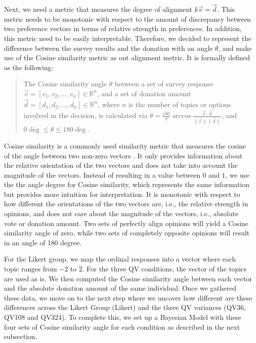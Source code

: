 Next, 
we need a metric that 
measures the degree of alignment $k\vec{v} = \vec{d}$.
This metric needs to be monotonic 
with respect to the amount of discrepancy 
between two preference vectors 
in terms of relative strength in preferences. 
In addition,
this metric need to be easily interpretable. 
Therefore,
we decided to represent the difference
between the survey results and the donation
with an angle $\theta$,
and make use of the Cosine similarity metric 
as out alignment metric. 
It is formally defined as the following: \par

\begin{quote}
    The Cosine similarity angle $\theta$ between a set of survey response $\vec{v} = [v_1, v_2, ..., v_n] \in \mathbb{R}^n$, and a set of donation amount $\vec{d} = [d_1, d_2, ..., d_n] \in \mathbb{R}^n$, where $n$ is the number of topics or options involved in the decision, is calculated via $\theta = \frac{180}{\pi} \arccos{\frac{\vec{v} \cdot \vec{d}}{\|\vec{v}\| \|\vec{d}\|}}$, and $0\deg \leq \theta \leq 180\deg$.
\end{quote}

Cosine similarity is a commonly used similarity metric 
that measures the cosine of the angle 
between two non-zero vectors \cite{singhal2001modern}. 
It only provides information about 
the relative orientation 
of the two vectors and 
does not take into account 
the magnitude of the vectors. 
Instead of resulting in a value between $0$ and $1$,
we use the the angle degree for Cosine similarity,
which represents the same information 
but provides more intuition for interpretation.
It is monotonic with respect to 
how different the orientations of the two vectors are,
i.e., the relative strength in opinions, 
and does not care about the magnitude of the vectors, 
i.e., absolute vote or donation amount. 
Two sets of perfectly align opinions 
will yield a Cosine similarity angle of zero, 
while two sets of completely opposite opinions 
will result in an angle of 180 degree.

For the Likert group, 
we map the ordinal responses into a vector
where each topic ranges from $-2$ to $2$.
For the three QV conditions,
the vector of the topics are used as is.
We then computed the Cosine similarity angle between each vector 
and the absolute donation amount of the same individual. 
Once we gathered these data,
we move on to the next step
where we uncover how different are these differences
across the Likert Group (Likert) 
and the three QV variances (QV36, QV108 and QV324).
To complete this,
we set up a Bayesian Model 
with these four sets of Cosine similarity angle for each 
condition as described in the next subsection.

